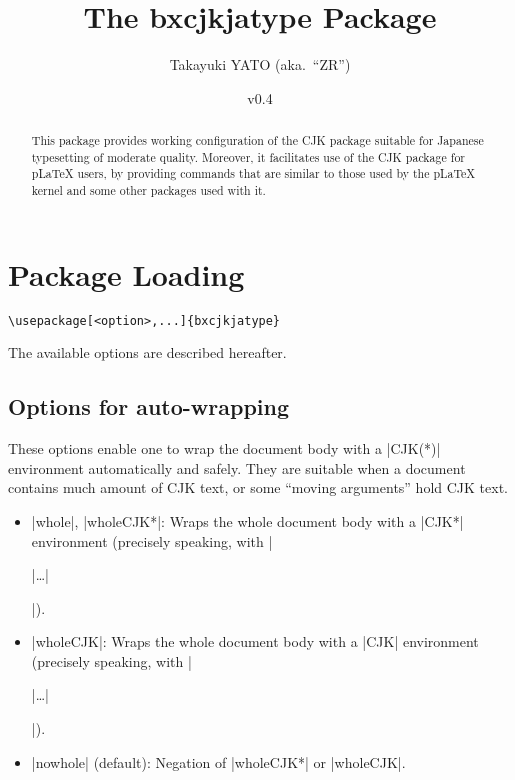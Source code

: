 \documentclass[a4paper]{article}
\newcommand{\PkgVersion}{0.4}
\newcommand{\PkgDate}{2016/11/11}
\newcommand{\Pkg}[1]{\textsf{#1}}
\newcommand{\Means}{:\hspace{1em plus 1em}}
\newcommand{\wbr}{\linebreak[0]}
\providecommand{\pLaTeX}{p\LaTeX}
\begin{document}
\title{The \Pkg{bxcjkjatype} Package}
\author{Takayuki YATO (aka.~``ZR'')}
\date{v\PkgVersion\quad[\PkgDate]}
\maketitle

\begin{abstract}
This package provides working configuration of the \Pkg{CJK} package
suitable for Japanese typesetting of moderate quality.
Moreover, it facilitates use of the \Pkg{CJK} package for {\pLaTeX}
users, by providing commands that are similar to those used by the
{\pLaTeX} kernel and some other packages used with it.
\end{abstract}

\tableofcontents

\section{Package Loading}
\label{sec:loading}

\begin{verbatim}
\usepackage[<option>,...]{bxcjkjatype}
\end{verbatim}

The available options are described hereafter.

\subsection{Options for auto-wrapping}

These options enable one to wrap the document body with a |CJK(*)|
environment automatically and safely.
They are suitable when a document contains much amount of CJK text,
or some ``moving arguments'' hold CJK text.

\begin{itemize}
\item |whole|, |wholeCJK*|\Means
  Wraps the whole document body with a |CJK*| environment
  (precisely speaking, with |\begin{uCJK*}|\ldots\wbr|\end{uCJK*}|).
\item |wholeCJK|\Means
  Wraps the whole document body with a |CJK| environment
  (precisely speaking, with |\begin{uCJK}|\ldots\wbr|\end{uCJK}|).
\item |nowhole| (default)\Means
  Negation of |wholeCJK*| or |wholeCJK|.
\end{itemize}
\end{document}
